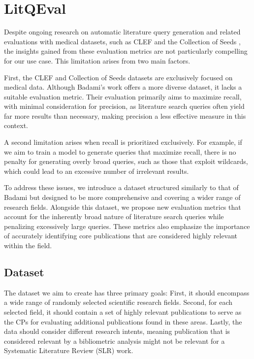 {\let\clearpage\relax \chapter{LitQEval}\label{ch:ownApproach}}
Despite ongoing research on automatic literature query generation and related evaluations with medical datasets, such as CLEF \autocite{kanoulas2017clef, kanoulas2018clef, kanoulas2019clef} and the Collection of Seeds \autocite{Wang_2022}, the insights gained from these evaluation metrics are not particularly compelling for our use case. This limitation arises from two main factors. 

First, the CLEF and Collection of Seeds datasets are exclusively focused on medical data. Although Badami's work \autocite{badami2023adaptive} offers a more diverse dataset, it lacks a suitable evaluation metric. Their evaluation primarily aims to maximize recall, with minimal consideration for precision, as literature search queries often yield far more results than necessary, making precision a less effective measure in this context. 

A second limitation arises when recall is prioritized exclusively. For example, if we aim to train a model to generate queries that maximize recall, there is no penalty for generating overly broad queries, such as those that exploit wildcards, which could lead to an excessive number of irrelevant results.

To address these issues, we introduce a dataset structured similarly to that of Badami \autocite{badami2023adaptive} but designed to be more comprehensive and covering a wider range of research fields. Alongside this dataset, we propose new evaluation metrics that account for the inherently broad nature of literature search queries while penalizing excessively large queries. These metrics also emphasize the importance of accurately identifying core publications that are considered highly relevant within the field.

\vspace*{0.5cm}\section{Dataset}\label{sec:dataset}
The dataset we aim to create has three primary goals: First, it should encompass a wide range of randomly selected scientific research fields. Second, for each selected field, it should contain a set of highly relevant publications to serve as the CPs for evaluating additional publications found in these areas. Lastly, the data should consider different research intents, meaning publication that is considered relevant by a bibliometric analysis might not be relevant for a Systematic Literature Review (SLR) work.

